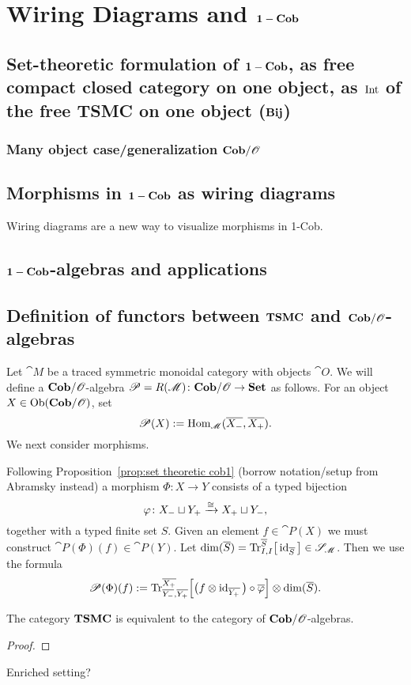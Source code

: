 \chapter{Wiring Diagrams and $\mathbf{1-Cob}$}
\section{Set-theoretic formulation of $\mathbf{1-Cob}$, as free compact closed category on one object, as $\operatorname{Int}$ of the free TSMC on one object ($\mathbf{Bij}$)}
\subsection{Many object case/generalization $\mathbf{Cob}/\mathscr{O}$}

\section{Morphisms in $\mathbf{1-Cob}$ as wiring diagrams}

Wiring diagrams are a new way to visualize morphisms in 1-Cob.


\section{$\mathbf{1-Cob}$-algebras and applications}

\section{Definition of functors between $\mathbf{TSMC}$ and $\mathbf{Cob}/\mathscr{O}$-algebras}

Let $\cat{M}$ be a traced symmetric monoidal category with objects $\cat{O}$. We will define a $\mathbf{Cob}/\mathscr{O}$-algebra $\mathscr{P}=R(\mathscr{M})\colon\mathbf{Cob}/\mathscr{O}\to\mathbf{Set}$ as follows. For an object $X\in\operatorname{Ob}(\mathbf{Cob}/\mathscr{O})$, set 
$$\mathscr{P}(X):=\operatorname{Hom}_{\mathscr{M}}(\overline{{X_-}},\overline{{X_+}}).$$
We next consider morphisms.

Following Proposition~\ref{prop:set theoretic cob1} (borrow notation/setup from Abramsky instead) a morphism $\Phi\colon X\longrightarrow Y$ consists of a typed bijection 
$$\varphi\colon{X_-}\sqcup {Y_+}\xrightarrow{\cong}{X_+}\sqcup {Y_-},$$ 
together with a typed finite set $S$. Given an element $f\in\cat{P}(X)$ we must construct $\cat{P}(\Phi)(f)\in\cat{P}(Y)$. Let $\dim(\overline{S})=\textnormal{Tr}^{\overline{S}}_{I,I}\big[\operatorname{id}_{\overline{S}}\big]\in\mathscr{S}_{\mathscr{M}}$. Then we use the formula
$$\mathscr{P}(\Phi)(f):=
\textnormal{Tr}^{\overline{X_+}}_{\overline{Y_-},\overline{Y_+}}\Big[\big(f\otimes\operatorname{id}_{\overline{Y_+}}\big)\circ\overline{\varphi}\Big]
\otimes\dim(\overline{S}).	
$$

\begin{theorem}
 The category $\mathbf{TSMC}$ is equivalent to the category of $\mathbf{Cob}/\mathscr{O}$-algebras.
\end{theorem}
\begin{proof}
 
\end{proof}
\begin{corollary}
 Enriched setting?
\end{corollary}


